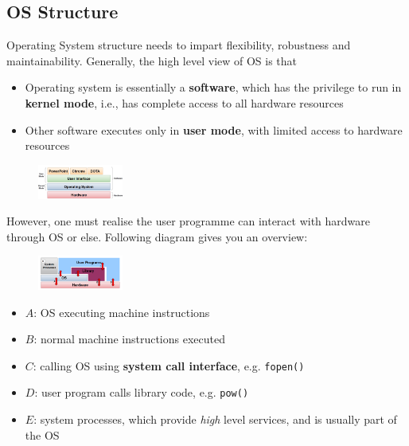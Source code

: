\documentclass[11pt]{article}
\theoremstyle{definition}
\begin{document}
\subsection{OS Structure}
Operating System structure needs to impart flexibility, robustness and maintainability. Generally, the high level view of OS is that
\begin{itemize}[itemsep=0pt]
  \item Operating system is essentially a \textbf{software}, which has the privilege to run in \textbf{kernel mode}, i.e., has complete access to all hardware resources
  \item Other software executes only in \textbf{user mode}, with limited access to hardware resources
\end{itemize}
\begin{figure}[h]
\centering
\includegraphics[width = 0.25\textwidth]{1_4.png}
\end{figure}
However, one must realise the user programme can interact with hardware through OS or else. Following diagram gives you an overview:
\begin{figure}[h]
\centering
\includegraphics[width = 0.25\textwidth]{1_5.png}
\end{figure}
\begin{itemize}[itemsep=0pt]
  \item $A$: OS executing machine instructions
  \item $B$: normal machine instructions executed
  \item $C$: calling OS using \textbf{system call interface}, e.g. \texttt{fopen()}
  \item $D$: user program calls library code, e.g. \texttt{pow()}
  \item $E$: system processes, which provide \textit{high} level services, and is usually part of the OS
\end{itemize}
\end{document}
